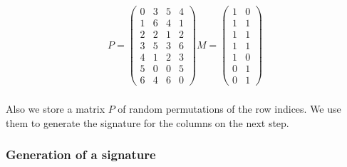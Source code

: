 \begin{equation}
    \begin{split}
        P = 
        \begin{pmatrix}
            0 & 3 & 5 & 4 \\
            1 & 6 & 4 & 1 \\
            2 & 2 & 1 & 2 \\
            3 & 5 & 3 & 6 \\
            4 & 1 & 2 & 3 \\
            5 & 0 & 0 & 5 \\
            6 & 4 & 6 & 0
        \end{pmatrix}
        M = 
        \begin{pmatrix}
            1 & 0 \\
            1 & 1 \\
            1 & 1 \\
            1 & 1 \\
            1 & 0 \\
            0 & 1 \\
            0 & 1
        \end{pmatrix}   
    \end{split}
\end{equation} \\

Also we store a matrix $ P $ of random permutations of the row indices. We use them to generate the signature for the columns on the next step.\\  



\subsubsection{Generation of a signature}





